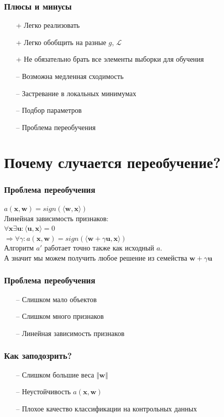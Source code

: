 \documentclass[10pt]{beamer}
\begin{document}
\begin{frame}\frametitle{Плюсы и минусы}
	\begin{itemize} [<+->]
	\item[+] Легко реализовать
	\item[+] Легко обобщить на разные $g$, $\mathcal{L}$
	\item[+] Не обязательно брать все элементы выборки для обучения
	\bigbreak
	\item[--] Возможна медленная сходимость
	\item[--] Застревание в локальных минимумах
	\item[--] Подбор параметров
	\item[--] Проблема переобучения
	\end{itemize}
\end{frame}

\section{Почему случается переобучение?}

\begin{frame}\frametitle{Проблема переобучения}
	$a(\mathbf{x}, \mathbf{w}) = sign(\langle \mathbf{w}, \mathbf{x}\rangle)$\\
	Линейная зависимость признаков:\\
	$\forall \mathbf{x} \exists \mathbf{u}: \langle \mathbf{u}, \mathbf{x}\rangle = 0$\\
	$\Rightarrow \forall \gamma: a(\mathbf{x}, \mathbf{w}) = sign(\langle \mathbf{w} + \gamma \mathbf{u}, \mathbf{x}\rangle)$\\
	\bigbreak
	Алгоритм $a'$ работает точно также как исходный $a$.\\
	А значит мы можем получить любое решение из семейства $\mathbf{w} + \gamma \mathbf{u}$
\end{frame}

\begin{frame}\frametitle{Проблема переобучения}
	\begin{itemize}
		\item[--] Слишком мало объектов
		\item[--] Слишком много признаков
		\item[--] Линейная зависимость признаков
	\end{itemize}
\end{frame}

\begin{frame}\frametitle{Как заподозрить?}
	\begin{itemize}
		\item[--] Слишком большие веса $\Vert \mathbf{w} \Vert$
		\item[--] Неустойчивость $a(\mathbf{x},\mathbf{w})$
		\item[--] Плохое качество классификации на контрольных данных
	\end{itemize}
\end{frame}
\end{document}
